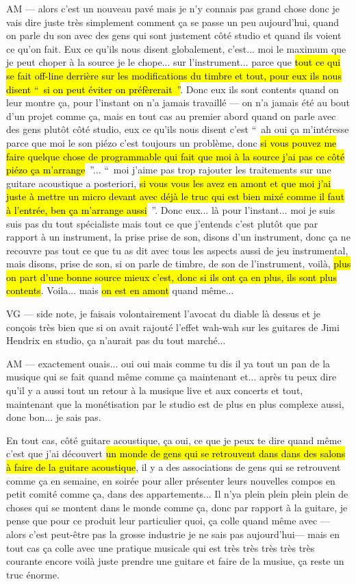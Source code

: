 AM — alors c'est un nouveau pavé mais je n'y connais pas grand chose donc je vais dire juste très simplement comment ça se passe un peu aujourd'hui, quand on parle du son avec des gens qui sont justement côté studio et quand ils voient ce qu'on fait. Eux ce qu'ils nous disent globalement, c'est... moi le maximum que je peut choper à la source je le chope... sur l'instrument... parce que \hl{tout ce qui se fait off-line derrière sur les modifications du timbre et tout, pour eux ils nous disent “ si on peut éviter on préfèrerait ”}. Donc eux ils sont contents quand on leur montre ça, pour l'instant on n'a jamais travaillé — on n'a jamais été au bout d'un projet comme ça, mais en tout cas au premier abord quand on parle avec des gens plutôt côté studio, eux ce qu'ils nous disent c'est “ ah oui ça m'intéresse parce que moi le son piézo c'est toujours un problème, donc \hl{si vous pouvez me faire quelque chose de programmable qui fait que moi à la source j'ai pas ce côté piézo ça m'arrange} ”... “ moi j'aime pas trop rajouter les traitements sur une guitare acoustique a posteriori, \hl{si vous vous les avez en amont et que moi j'ai juste à mettre un micro devant avec déjà le truc qui est bien mixé comme il faut à l'entrée, ben ça m'arrange aussi} ”. Donc eux... là pour l'instant... moi je suis suis pas du tout spécialiste mais tout ce que j'entends c'est plutôt que par rapport à un instrument, la prise prise de son, disons d'un instrument, donc ça ne recouvre pas tout ce que tu as dit avec tous les aspects aussi de jeu instrumental, mais disons, prise de son, si on parle de timbre, de son de l'instrument, voilà, \hl{plus on part d'une bonne source mieux c'est, donc si ils ont ça en plus, ils sont plus contents}. Voila... mais \hl{on est en amont} quand même... 

VG —  side note, je faisais volontairement l'avocat du diable là dessus et je conçois très bien que si on avait rajouté l'effet wah-wah sur les guitares de Jimi Hendrix en studio, ça n'aurait pas du tout marché... 

AM — exactement ouais... oui oui mais comme tu dis il ya tout un pan de la musique qui se fait quand même comme ça maintenant et... après tu peux dire qu'il y a aussi tout un retour à la musique live et aux concerts et tout, maintenant que la monétisation par le studio est de plus en plus complexe aussi, donc bon... je sais pas. 

En tout cas, côté guitare acoustique, ça oui, ce que je peux te dire quand même c'est que j'ai découvert \hl{un monde de gens qui se retrouvent dans dans des salons à faire de la guitare acoustique}, il y a des associations de gens qui se retrouvent comme ça en semaine, en soirée pour aller présenter leurs nouvelles compos en petit comité comme ça, dans des appartements... Il n'ya plein plein plein plein de choses qui se montent dans le monde comme ça, donc par rapport à la guitare, je pense que pour ce produit leur particulier quoi, ça colle quand même avec — alors c'est peut-être pas la grosse industrie je ne sais pas aujourd'hui— mais en tout cas ça colle avec une pratique musicale qui est très très très très très courante encore voilà juste prendre une guitare et faire de la musiue, ça reste un truc énorme.

